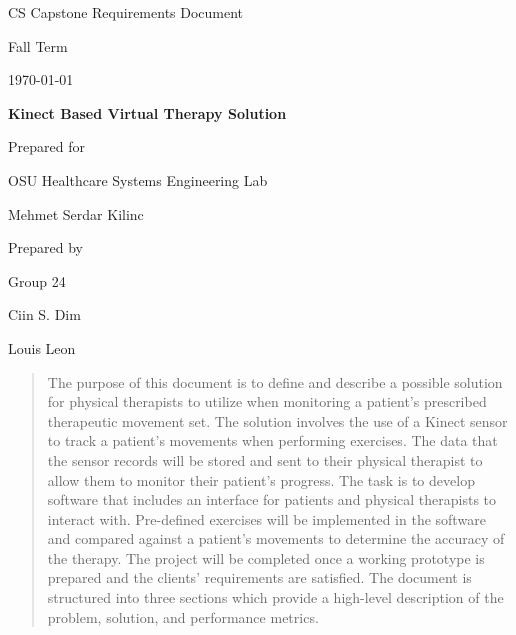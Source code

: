 \documentclass[onecolumn, draftclsnofoot,10pt, compsoc]{IEEEtran}
\def \CapstoneTeamName{     TeamName}
\def \CapstoneTeamNumber{       24}
\def \GroupMemberOne{            Ciin S. Dim}
\def \GroupMemberTwo{           Louis Leon}
\def \CapstoneProjectName{      Kinect Based Virtual Therapy Solution}
\def \CapstoneSponsorCompany{   OSU Healthcare Systems Engineering Lab}
\def \CapstoneSponsorPerson{        Mehmet Serdar Kilinc}
\def \DocType{      %
                Requirements Document
                }
\newcommand{\NameSigPair}[1]{\par
\makebox[2.75in][r]{#1} \hfil   \makebox[3.25in]{\makebox[2.25in]{\hrulefill} \hfill        \makebox[.75in]{\hrulefill}}
\par\vspace{-12pt} \textit{\tiny\noindent
\makebox[2.75in]{} \hfil        \makebox[3.25in]{\makebox[2.25in][r]{Signature} \hfill  \makebox[.75in][r]{Date}}}}
\renewcommand{\NameSigPair}[1]{#1}
\begin{document}
\begin{titlepage}
    \begin{singlespace}
        \hfill 
        \par\vspace{.2in}
        \centering
        \scshape{
            \huge CS Capstone\DocType \par
            {\large Fall Term}\par
            {\large\today}\par
            \vspace{.5in}
            \textbf{\Huge\CapstoneProjectName}\par
            \vfill
            {\large Prepared for}\par
            \Huge \CapstoneSponsorCompany\par
            \vspace{5pt}
            {\Large\NameSigPair{\CapstoneSponsorPerson}\par}
            {\large Prepared by }\par
            Group\CapstoneTeamNumber\par
            \vspace{5pt}
            {\Large
                \NameSigPair{\GroupMemberOne}\par
                \NameSigPair{\GroupMemberTwo}\par
            }
            \vspace{20pt}
        }
        \begin{abstract}
            The purpose of this document is to define and describe a possible solution for physical therapists to utilize when monitoring a patient's prescribed therapeutic movement set. The solution involves the use of a Kinect sensor to track a patient's movements when performing exercises. The data that the sensor records will be stored and sent to their physical therapist to allow them to monitor their patient's progress. The task is to develop software that includes an interface for patients and physical therapists to interact with. Pre-defined exercises will be implemented in the software and compared against a patient's movements to determine the accuracy of the therapy. The project will be completed once a working prototype is prepared and the clients' requirements are satisfied. The document is structured into three sections which provide a high-level description of the problem, solution, and performance 
metrics.
        \end{abstract}     
    \end{singlespace}
\end{titlepage}
\newpage
{}
\tableofcontents
\clearpage
\end{document}
